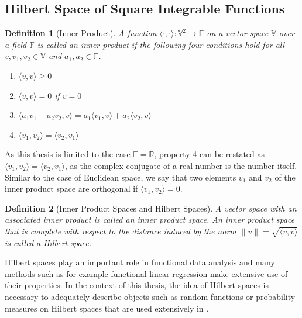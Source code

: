 \documentclass[12pt, a4paper]{article}
\theoremstyle{MAstyle} \newtheorem{assumption}{Assumption}[section]
\theoremstyle{MAstyle} \newtheorem{definition}{Definition}[section]
\theoremstyle{MAstyle} \newtheorem{theorem}{Theorem}[section]
\begin{document}
		\subsection{Hilbert Space of Square Integrable Functions}\label{Square_Integrable_Functions}
			\begin{definition}[Inner Product]
				A function $\langle \cdot , \cdot \rangle : \mathbb{V}^2 \rightarrow \mathbb{F}$ on a vector space $\mathbb{V}$ over a field $\mathbb{F}$ is called an inner product if the following four conditions hold for all $v, v_1, v_2 \in \mathbb{V}$ and $a_1, a_2 \in \mathbb{F}$.
				\begin{multicols}{2}
					\begin{enumerate}
						\item $\langle v,v \rangle \geq 0$
						\item $\langle v,v \rangle = 0$ if $v = 0$
						\item $\langle a_1 v_1 + a_2 v_2, v \rangle = a_1 \langle v_1, v \rangle + a_2 \langle v_2, v \rangle$
						\item $\langle v_1, v_2 \rangle = \overline{\langle v_2, v_1 \rangle}$
					\end{enumerate}
				\end{multicols}
			\end{definition}
			As this thesis is limited to the case $\mathbb{F} = \mathbb{R}$, property 4 can be restated as $\langle v_1, v_2 \rangle = \langle v_2, v_1 \rangle$, as the complex conjugate of a real number is the number itself. Similar to the case of Euclidean space, we say that two elements $v_1$ and $v_2$ of the inner product space are orthogonal if $\langle v_1, v_2 \rangle = 0$.
			
			\begin{definition}[Inner Product Spaces and Hilbert Spaces]
				A vector space with an associated inner product is called an inner product space.
				An inner product space that is complete with respect to the distance induced by the norm $\| v \| = \sqrt{\langle v, v\rangle}$ is called a Hilbert space.
			\end{definition}
			Hilbert spaces play an important role in functional data analysis and many methods such as for example functional linear regression make extensive use of their properties. In the context of this thesis, the idea of Hilbert spaces is necessary to adequately describe objects such as random functions or probability measures on Hilbert spaces that are used extensively in \cite{bugni_permutation_2021}.\\
			
\end{document}
